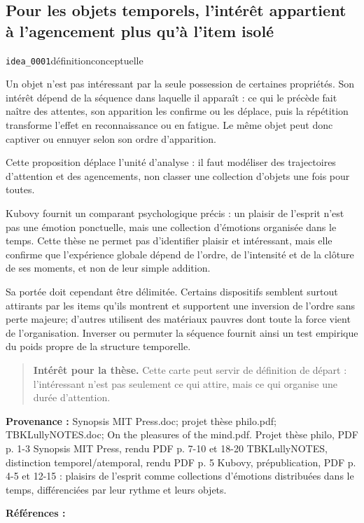 \documentclass[10pt,a4paper]{article}
\begin{document}
\subsection{Pour les objets temporels, l'intérêt appartient à l'agencement plus qu'à l'item isolé}
{\small\color{metadata} \texttt{idea\_0001}\quad\textbullet\quad définition\quad\textbullet\quad conceptuelle\par}

Un objet n'est pas intéressant par la seule possession de certaines propriétés. Son intérêt dépend de la séquence dans laquelle il apparaît : ce qui le précède fait naître des attentes, son apparition les confirme ou les déplace, puis la répétition transforme l'effet en reconnaissance ou en fatigue. Le même objet peut donc captiver ou ennuyer selon son ordre d'apparition.

Cette proposition déplace l'unité d'analyse : il faut modéliser des trajectoires d'attention et des agencements, non classer une collection d'objets une fois pour toutes.

Kubovy fournit un comparant psychologique précis : un plaisir de l'esprit n'est pas une émotion ponctuelle, mais une collection d'émotions organisée dans le temps. Cette thèse ne permet pas d'identifier plaisir et intéressant, mais elle confirme que l'expérience globale dépend de l'ordre, de l'intensité et de la clôture de ses moments, et non de leur simple addition.

Sa portée doit cependant être délimitée. Certains dispositifs semblent surtout attirants par les items qu'ils montrent et supportent une inversion de l'ordre sans perte majeure; d'autres utilisent des matériaux pauvres dont toute la force vient de l'organisation. Inverser ou permuter la séquence fournit ainsi un test empirique du poids propre de la structure temporelle.

\begin{quote}
\textbf{Intérêt pour la thèse.} Cette carte peut servir de définition de départ : l'intéressant n'est pas seulement ce qui attire, mais ce qui organise une durée d'attention.
\end{quote}
{\footnotesize\color{metadata}\textbf{Provenance :} Synopsis MIT Press.doc; projet thèse philo.pdf; TBKLullyNOTES.doc; On the pleasures of the mind.pdf. Projet thèse philo, PDF p. 1-3 Synopsis MIT Press, rendu PDF p. 7-10 et 18-20 TBKLullyNOTES, distinction temporel/atemporal, rendu PDF p. 5 Kubovy, prépublication, PDF p. 4-5 et 12-15 : plaisirs de l'esprit comme collections d'émotions distribuées dans le temps, différenciées par leur rythme et leurs objets.\par}
{\footnotesize\color{metadata}\textbf{Références :} \parencite{kubovy1999pleasures}\par}
\end{document}
